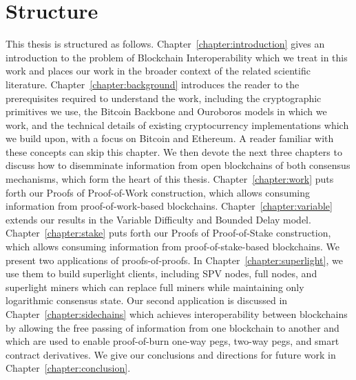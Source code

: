 \section*{Structure}

This thesis is structured as follows. Chapter~\ref{chapter:introduction} gives
an introduction to the problem of Blockchain Interoperability which we treat in
this work and places our work in the broader context of the related scientific
literature. Chapter~\ref{chapter:background} introduces the reader to the
prerequisites required to understand the work, including the cryptographic
primitives we use, the Bitcoin Backbone and Ouroboros models in which we work, and the
technical details of existing cryptocurrency implementations which we build
upon, with a focus on Bitcoin and Ethereum. A reader familiar with
these concepts can skip this chapter. We then devote the next three chapters to
discuss how to disemminate information from open blockchains of both consensus
mechanisms, which form the heart of this thesis. Chapter~\ref{chapter:work} puts forth our Proofs of Proof-of-Work
construction, which allows consuming information from proof-of-work-based
blockchains. Chapter~\ref{chapter:variable} extends our results in the Variable Difficulty and Bounded Delay model. Chapter~\ref{chapter:stake} puts forth our Proofs of
Proof-of-Stake construction, which allows consuming information from
proof-of-stake-based blockchains. We present two applications of
proofs-of-proofs. In Chapter~\ref{chapter:superlight}, we use them to build
superlight clients, including SPV nodes, full nodes, and superlight miners which
can replace full miners while maintaining only logarithmic consensus state. Our
second application is discussed in Chapter~\ref{chapter:sidechains} which
achieves interoperability between blockchains by allowing the free passing
of information from one blockchain to another and which are used to enable proof-of-burn one-way pegs, two-way pegs, and smart contract derivatives. We give our conclusions and
directions for future work in Chapter~\ref{chapter:conclusion}.
